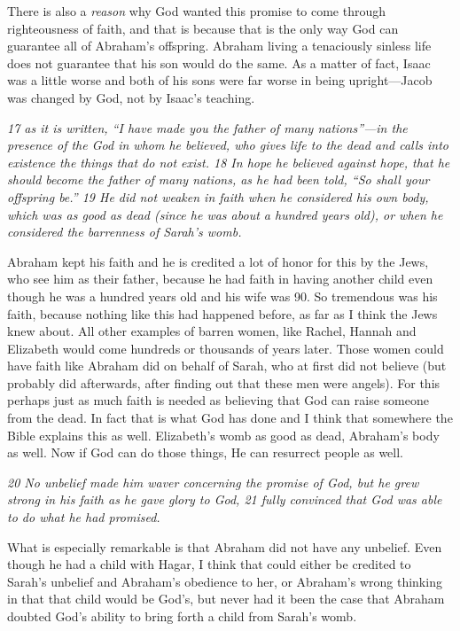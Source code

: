 There is also a \emph{reason} why God wanted this promise to come
through righteousness of faith, and that is because that is the only way
God can guarantee all of Abraham's offspring. Abraham living a
tenaciously sinless life does not guarantee that his son would do the
same. As a matter of fact, Isaac was a little worse and both of his sons
were far worse in being upright---Jacob was changed by God, not by
Isaac's teaching.

\emph{17 as it is written, ``I have made you the father of many
nations''---in the presence of the God in whom he believed, who gives
life to the dead and calls into existence the things that do not exist.
18 In hope he believed against hope, that he should become the father of
many nations, as he had been told, ``So shall your offspring be.'' 19 He
did not weaken in faith when he considered his own body, which was as
good as dead (since he was about a hundred years old), or when he
considered the barrenness of Sarah's womb.}

Abraham kept his faith and he is credited a lot of honor for this by the
Jews, who see him as their father, because he had faith in having
another child even though he was a hundred years old and his wife was
90. So tremendous was his faith, because nothing like this had happened
before, as far as I think the Jews knew about. All other examples of
barren women, like Rachel, Hannah and Elizabeth would come hundreds or
thousands of years later. Those women could have faith like Abraham did
on behalf of Sarah, who at first did not believe (but probably did
afterwards, after finding out that these men were angels). For this
perhaps just as much faith is needed as believing that God can raise
someone from the dead. In fact that is what God has done and I think
that somewhere the Bible explains this as well. Elizabeth's womb as good
as dead, Abraham's body as well. Now if God can do those things, He can
resurrect people as well.

\emph{20 No unbelief made him waver concerning the promise of God, but
he grew strong in his faith as he gave glory to God, 21 fully convinced
that God was able to do what he had promised.}

What is especially remarkable is that Abraham did not have any unbelief.
Even though he had a child with Hagar, I think that could either be
credited to Sarah's unbelief and Abraham's obedience to her, or
Abraham's wrong thinking in that that child would be God's, but never
had it been the case that Abraham doubted God's ability to bring forth a
child from Sarah's womb.

